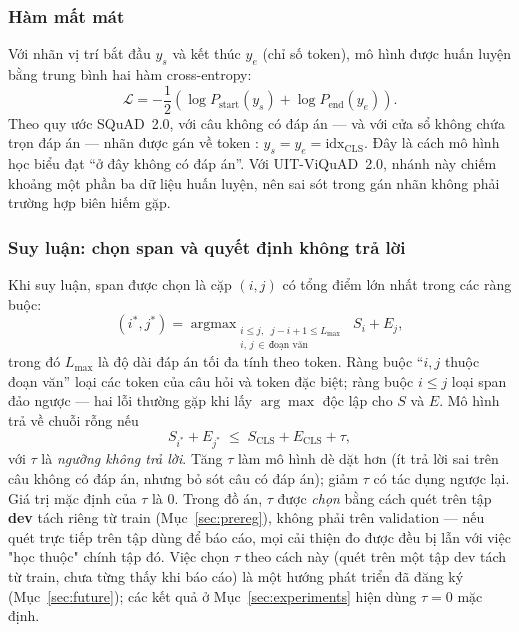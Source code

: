 \subsubsection{Hàm mất mát}

Với nhãn vị trí bắt đầu $y_s$ và kết thúc $y_e$ (chỉ số token), mô hình được huấn luyện
bằng trung bình hai hàm cross-entropy:
\begin{equation}
  \mathcal{L} = -\frac{1}{2}\left( \log P_{\text{start}}(y_s) + \log P_{\text{end}}(y_e) \right).
  \label{eq:qaloss}
\end{equation}
Theo quy ước SQuAD~2.0, với câu không có đáp án --- và với cửa sổ không chứa trọn đáp án
--- nhãn được gán về token \code{[CLS]}: $y_s = y_e = \text{idx}_{\text{CLS}}$. Đây là
cách mô hình học biểu đạt ``ở đây không có đáp án''. Với UIT-ViQuAD~2.0, nhánh này chiếm
khoảng một phần ba dữ liệu huấn luyện, nên sai sót trong gán nhãn không phải trường hợp
biên hiếm gặp.

\subsubsection{Suy luận: chọn span và quyết định không trả lời}

Khi suy luận, span được chọn là cặp $(i, j)$ có tổng điểm lớn nhất trong các ràng buộc:
\begin{equation}
  (i^\ast, j^\ast) = \mathop{\arg\max}_{\substack{i \le j,\;\; j - i + 1 \le L_{\max} \\ i,\, j \,\in\, \text{đoạn văn}}} \; S_i + E_j ,
  \label{eq:span}
\end{equation}
trong đó $L_{\max}$ là độ dài đáp án tối đa tính theo token. Ràng buộc ``$i, j$ thuộc đoạn
văn'' loại các token của câu hỏi và token đặc biệt; ràng buộc $i \le j$ loại span đảo
ngược --- hai lỗi thường gặp khi lấy $\arg\max$ độc lập cho $S$ và $E$. Mô hình trả về
chuỗi rỗng nếu
\begin{equation}
  S_{i^\ast} + E_{j^\ast} \;\le\; S_{\text{CLS}} + E_{\text{CLS}} + \tau ,
  \label{eq:null}
\end{equation}
với $\tau$ là \emph{ngưỡng không trả lời}. Tăng $\tau$ làm mô hình dè dặt hơn (ít trả lời
sai trên câu không có đáp án, nhưng bỏ sót câu có đáp án); giảm $\tau$ có tác dụng ngược
lại. Giá trị mặc định của $\tau$ là 0. \ifhasDev Trong đồ án, $\tau$ được \emph{chọn} bằng
cách quét trên tập \textbf{dev} tách riêng từ train (Mục~\ref{sec:prereg}), không phải trên
validation --- nếu quét trực tiếp trên tập dùng để báo cáo, mọi cải thiện đo được đều bị
lẫn với việc "học thuộc" chính tập đó. \else Việc chọn $\tau$ theo cách này (quét trên một
tập dev tách từ train, chưa từng thấy khi báo cáo) là một hướng phát triển đã đăng ký
(Mục~\ref{sec:future}); các kết quả ở Mục~\ref{sec:experiments} hiện dùng $\tau = 0$ mặc
định. \fi

